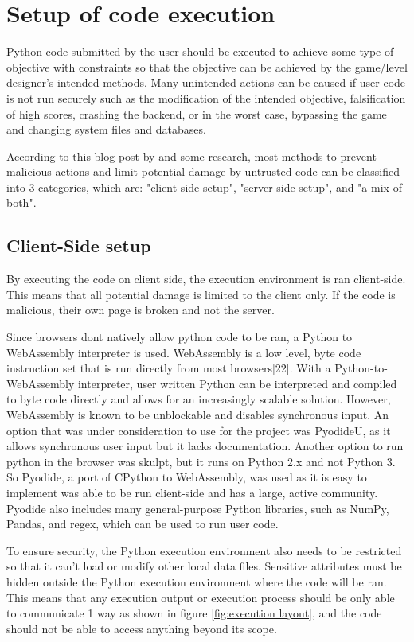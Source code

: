 \section{Setup of code execution}
Python code submitted by the user should be executed to achieve some type of objective with constraints so that the objective can be achieved by the game/level designer's intended methods. Many unintended actions can be caused if user code is not run securely such as the modification of the intended objective, falsification of high scores, crashing the backend, or in the worst case, bypassing the game and changing system files and databases.

According to this blog post by \cite{codecombat_aether} and some research, most methods to prevent malicious actions and limit potential damage by untrusted code can be classified into 3 categories, which are: "client-side setup", "server-side setup", and "a mix of both".

\subsection{Client-Side setup}
By executing the code on client side, the execution environment is ran client-side. This means that all potential damage is limited to the client only. If the code is malicious, their own page is broken and not the server.

Since browsers dont natively allow python code to be ran, a Python to WebAssembly interpreter is used. WebAssembly is a low level, byte code instruction set that is run directly from most browsers[22]. With a Python-to-WebAssembly interpreter, user written Python can be interpreted and compiled to byte code directly and allows for an increasingly scalable solution. However, WebAssembly is known to be unblockable and disables synchronous input. An option that was under consideration to use for the project was PyodideU, as it allows synchronous user input but it lacks documentation. Another option to run python in the browser was skulpt, but it runs on Python 2.x and not Python 3. So Pyodide, a port of CPython to WebAssembly, was used as it is easy to implement was able to be run client-side and has a large, active community. Pyodide also includes many general-purpose Python libraries, such as NumPy, Pandas, and regex, which can be used to run user code.

To ensure security, the Python execution environment also needs to be restricted so that it can't load or modify other local data files. Sensitive attributes must be hidden outside the Python execution environment where the code will be ran. This means that any execution output or execution process should be only able to communicate 1 way as shown in figure \ref{fig:execution layout}, and the code should not be able to access anything beyond its scope.

